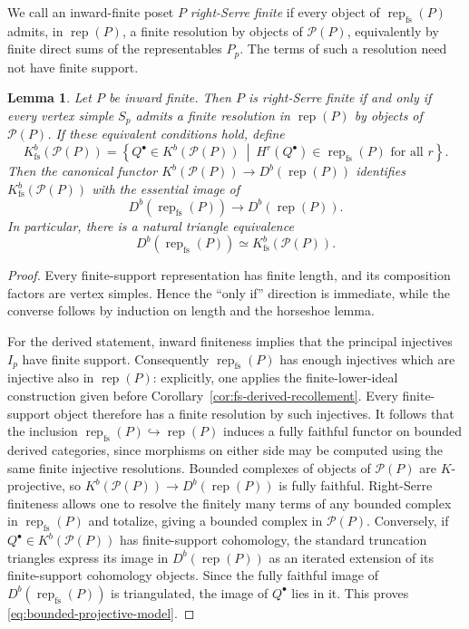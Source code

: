 \documentclass[10pt,a4paper]{amsart}
\newtheorem{lemma}[theorem]{Lemma}
\newcommand{\Rep}{\operatorname{rep}}
\begin{document}
We call an inward-finite poset $P$ \emph{right-Serre finite} if every object
of $\Rep_{\mathrm{fs}}(P)$ admits, in $\Rep(P)$, a finite resolution by
objects of $\mathcal P(P)$, equivalently by finite direct sums of the
representables $P_p$.  The terms of such a resolution need not have finite
support.

\begin{lemma}
\label{lem:right-serre-model}
Let $P$ be inward finite.  Then $P$ is right-Serre finite if and only if every
vertex simple $S_p$ admits a finite resolution in $\Rep(P)$ by objects of
$\mathcal P(P)$.  If these equivalent conditions hold, define
\[
K^b_{\mathrm{fs}}(\mathcal P(P))
=
\left\{
Q^\bullet\in K^b(\mathcal P(P))\ \middle|\
H^r(Q^\bullet)\in\Rep_{\mathrm{fs}}(P)\text{ for all }r
\right\}.
\]
Then the canonical functor
$K^b(\mathcal P(P))\to D^b(\Rep(P))$ identifies
$K^b_{\mathrm{fs}}(\mathcal P(P))$ with the essential image of
\[
D^b(\Rep_{\mathrm{fs}}(P))\longrightarrow D^b(\Rep(P)).
\]
In particular, there is a natural triangle equivalence
\begin{equation}\label{eq:bounded-projective-model}
D^b(\Rep_{\mathrm{fs}}(P))
\simeq
K^b_{\mathrm{fs}}(\mathcal P(P)).
\end{equation}
\end{lemma}

\begin{proof}
Every finite-support representation has finite length, and its composition
factors are vertex simples.  Hence the ``only if'' direction is immediate,
while the converse follows by induction on length and the horseshoe lemma.

For the derived statement, inward finiteness implies that the principal
injectives $I_p$ have finite support.  Consequently
$\Rep_{\mathrm{fs}}(P)$ has enough injectives which are injective also in
$\Rep(P)$: explicitly, one applies the finite-lower-ideal construction given
before Corollary~\ref{cor:fs-derived-recollement}.  Every finite-support object
therefore has a finite resolution by such injectives.  It follows that the
inclusion
$\Rep_{\mathrm{fs}}(P)\hookrightarrow\Rep(P)$ induces a fully faithful
functor on bounded derived categories, since morphisms on either side may be
computed using the same finite injective resolutions.  Bounded complexes of objects of
$\mathcal P(P)$ are $K$-projective, so
$K^b(\mathcal P(P))\to D^b(\Rep(P))$ is fully faithful.  Right-Serre
finiteness allows one to resolve the finitely many terms of any bounded
complex in $\Rep_{\mathrm{fs}}(P)$ and totalize, giving a bounded complex in
$\mathcal P(P)$.  Conversely, if $Q^\bullet\in K^b(\mathcal P(P))$ has
finite-support cohomology, the standard truncation triangles express its
image in $D^b(\Rep(P))$ as an iterated extension of its finite-support
cohomology objects.  Since the fully faithful image of
$D^b(\Rep_{\mathrm{fs}}(P))$ is triangulated, the image of $Q^\bullet$ lies
in it.  This proves \eqref{eq:bounded-projective-model}.
\end{proof}
\end{document}
